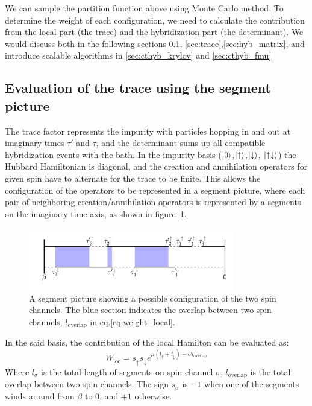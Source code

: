 We can sample the partition function above using Monte Carlo method. To 
determine the weight of each configuration, we need to calculate the contribution
from the local part (the trace) and the hybridization part (the determinant).
We would discuss both in the following sections \ref{sec:trace_segment},
\ref{sec:trace},\ref{sec:hyb_matrix}, and introduce scalable 
algorithms in \ref{sec:cthyb_krylov} and \ref{sec:cthyb_fmu}

\subsection{Evaluation of the trace using the segment picture}
\label{sec:trace_segment}
The trace factor represents the impurity with particles hopping in and out at 
imaginary times $\tau'$ and $\tau$, and the determinant sums up all compatible 
hybridization events with the bath. 
In the impurity basis ($\left|0\right\rangle$,$\left|\uparrow\right\rangle$,$\left|\downarrow\right\rangle$,
$\left|\uparrow\downarrow\right\rangle$) the Hubbard Hamiltonian is diagonal, 
and the creation and annihilation operators for given spin have to alternate 
for the trace to be finite. This allows the configuration of the operators to be
represented in a segment picture, where each pair of neighboring creation/annihilation 
operators is represented by a segments on the imaginary time axis, as shown in 
figure~\ref{fig:seg}.

\begin{figure}[ht]
  \centering
  \includegraphics[width=0.8\textwidth] {img/segment.png}
  \caption{A segment picture showing a possible configuration of the two spin 
    channels. 
    The blue section indicates the overlap between two spin channels, 
    $l_\textrm{overlap}$ in eq.\ref{eq:weight_local}.}
\label{fig:seg}
\end{figure}


In the said basis, the contribution of the local Hamilton can be evaluated as:
\begin{equation}
\label{eq:weight_local}
W_{\textrm{loc}} = s_\uparrow s_\downarrow e ^{\mu(l_\uparrow+l_\downarrow)-Ul_{\textrm{overlap}}}
\end{equation}
Where $l_\sigma$ is the total length of segments on spin channel $\sigma$,
$l_{\textrm{overlap}}$ is the total overlap between two spin channels. The sign 
$s_\sigma$ is $-1$ when one of the segments winds around from $\beta$ to $0$, 
and $+1$ otherwise.


